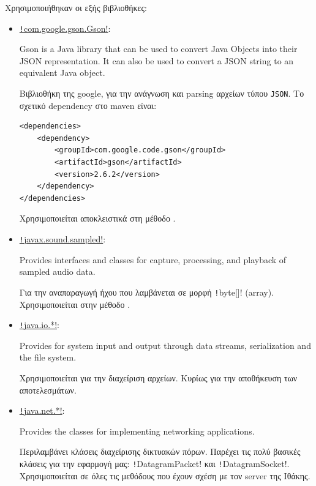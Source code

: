 Χρησιμοποιήθηκαν οι εξής βιβλιοθήκες:
\begin{itemize}
\item
\href{https://github.com/google/gson}{\texttt!com.google.gson.Gson!}:
\begin{displayquote}
Gson is a Java library that can be used to convert Java Objects into their JSON representation. It can also be used to convert a JSON string to an equivalent Java object.
\end{displayquote}
Βιβλιοθήκη της google, για την ανάγνωση και parsing αρχείων τύπου \texttt{JSON}.
Το σχετικό dependency στο maven είναι:
\begin{verbatim}
<dependencies>
    <dependency>
        <groupId>com.google.code.gson</groupId>
        <artifactId>gson</artifactId>
        <version>2.6.2</version>
    </dependency>
</dependencies>
\end{verbatim}
Χρησιμοποιείται αποκλειστικά στη μέθοδο .

\item
\href{https://docs.oracle.com/javase/8/docs/api/javax/sound/sampled/package-summary.html}{\texttt!javax.sound.sampled!}:
\begin{displayquote}
Provides interfaces and classes for capture, processing, and playback of sampled audio data.
\end{displayquote}
Για την αναπαραγωγή ήχου που λαμβάνεται σε μορφή \texttt!byte[]! (array).
Χρησιμοποιείται στην μέθοδο .

\item
\href{https://docs.oracle.com/javase/8/docs/api/java/io/package-summary.html}{\texttt!java.io.*!}:
\begin{displayquote}
Provides for system input and output through data streams, serialization and the file system.
\end{displayquote}
Χρησιμοποιείται για την διαχείριση αρχείων. Κυρίως για την αποθήκευση των αποτελεσμάτων.

\item
\href{https://docs.oracle.com/javase/8/docs/api/java/net/package-summary.html}{\texttt!java.net.*!}:
\begin{displayquote}
Provides the classes for implementing networking applications.
\end{displayquote}
Περιλαμβάνει κλάσεις διαχείρισης δικτυακών πόρων.
Παρέχει τις πολύ βασικές κλάσεις για την εφαρμογή μας:
\texttt!DatagramPacket! και \texttt!DatagramSocket!.
Χρησιμοποιείται σε όλες τις μεθόδους που έχουν σχέση με τον server της Ιθάκης.


\end{itemize}
